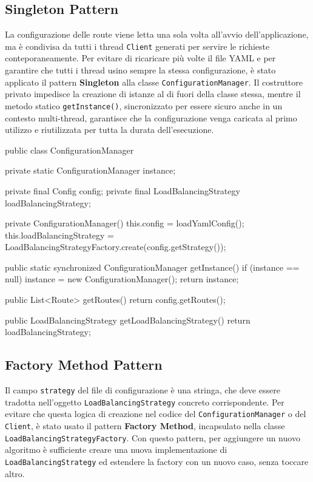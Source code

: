 \subsection{Singleton Pattern}
La configurazione delle route viene letta una sola volta all'avvio dell'applicazione, ma è condivisa da tutti i thread \texttt{Client} generati per servire le richieste conteporaneamente. 
Per evitare di ricaricare più volte il file YAML e per garantire che tutti i thread usino sempre la stessa configurazione, è stato applicato il pattern \textbf{Singleton} alla classe \texttt{ConfigurationManager}.
Il costruttore privato impedisce la creazione di istanze al di fuori della classe stessa, mentre il metodo statico \texttt{getInstance()}, sincronizzato per essere sicuro anche in un contesto multi-thread, garantisce che la configurazione venga caricata al primo utilizzo e riutilizzata per tutta la durata dell'esecuzione.

\begin{java}
public class ConfigurationManager {
    private static ConfigurationManager instance;

    private final Config config;
    private final LoadBalancingStrategy loadBalancingStrategy;

    private ConfigurationManager() {
        this.config = loadYamlConfig();
        this.loadBalancingStrategy =
            LoadBalancingStrategyFactory.create(config.getStrategy());
    }

    public static synchronized ConfigurationManager getInstance() {
        if (instance == null) {
            instance = new ConfigurationManager();
        }
        return instance;
    }

    public List<Route> getRoutes() {
        return config.getRoutes();
    }

    public LoadBalancingStrategy getLoadBalancingStrategy() {
        return loadBalancingStrategy;
    }
}
\end{java}

\subsection{Factory Method Pattern}
Il campo \texttt{strategy} del file di configurazione è una stringa, che deve essere tradotta nell'oggetto \texttt{LoadBalancingStrategy} concreto corrispondente. 
Per evitare che questa logica di creazione nel codice del \texttt{ConfigurationManager} o del \texttt{Client}, è stato usato il pattern \textbf{Factory Method}, incapsulato nella classe \texttt{LoadBalancingStrategyFactory}.
Con questo pattern, per aggiungere un nuovo algoritmo è sufficiente creare una nuova implementazione di \texttt{LoadBalancingStrategy} ed estendere la factory con un nuovo caso, senza toccare altro.

